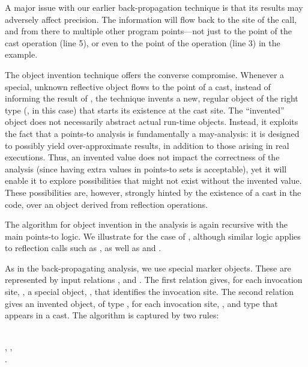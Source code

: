 A major issue with our earlier back-propagation technique is that its
results may adversely affect precision. The information will flow back
to the site of the  call, and from there to multiple other
program points---not just to the point of the cast operation (line 5),
or even to the point of the  operation (line 3) in the
example.

The object invention technique offers the converse compromise.
Whenever a special, unknown reflective object flows to the point of a
cast, instead of informing the result of , the technique
invents a new, regular object of the right type (, in this
case) that starts its existence at the cast site. The ``invented''
object does not necessarily abstract actual run-time objects.
Instead, it exploits the fact that a points-to analysis is
fundamentally a may-analysis: it is designed to possibly yield
over-approximate results, in addition to those arising in real
executions. Thus, an invented value does not impact the correctness of
the analysis (since having extra values in points-to sets is
acceptable), yet it will enable it to explore possibilities that might
not exist without the invented value. These possibilities are,
however, strongly hinted by the existence of a cast in the code, over
an object derived from reflection operations.

The algorithm for object invention in the analysis is again recursive
with the main points-to logic. We illustrate for the case of
, although similar logic applies to
reflection calls such as , as
well as  and .

As in the back-propagating analysis, we use special marker
objects.  These are represented by input relations
, and
. The first relation
gives, for each  invocation site, , a special
object, , that identifies the invocation site. The second
relation gives an invented object,  of type , for each
 invocation site, , and type  that
appears in a cast.  The algorithm is captured by two rules:

\begin{minipage}{0.95\columnwidth}
  \begin{rules}
      \\
    \tab {}, , \\
    \tab {}.\\
  \end{rules}
\end{minipage}

